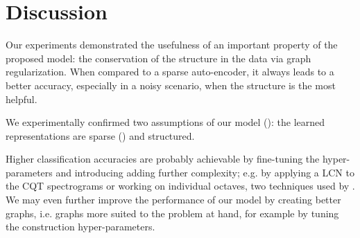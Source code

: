 

\section{Discussion}

Our experiments demonstrated the usefulness of an important property of the proposed model: the conservation of the structure in the data via graph regularization. When compared to a sparse auto-encoder, it always leads to a better accuracy, especially in a noisy scenario, when the structure is the most helpful.

We experimentally confirmed two assumptions of our model (): the learned representations are sparse () and structured.

Higher classification accuracies are probably achievable by fine-tuning the hyper-parameters and introducing adding further complexity; e.g. by applying a \gls{LCN} to the \gls{CQT} spectrograms or working on individual octaves, two techniques used by \cite{lecun2011PSDaudio}. We may even further improve the performance of our model by creating better graphs, i.e. graphs more suited to the problem at hand, for example by tuning the construction hyper-parameters.